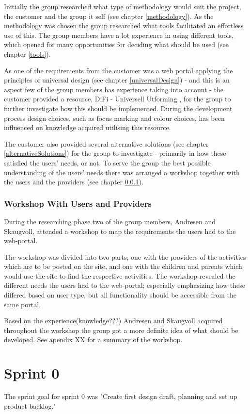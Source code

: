 Initially the group researched what type of methodology would suit the project, the customer and the group it self (see chapter \ref{methodology}). As the methodology was chosen the group researched what tools facilitated an effortless use of this. The group members have a lot experience in using different tools, which opened for many opportunities for deciding what should be used (see chapter \ref{tools}).

As one of the requirements from the customer was a web portal applying the principles of universal design (see chapter \ref{universalDesign}) - and this is an aspect few of the group members has experience taking into account - the customer provided a resource, DiFi - Universell Utforming \cite{Difi}, for the group to further investigate how this should be implemented. During the development process design choices, such as focus marking and colour choices, has been influenced on knowledge acquired utilising this resource. 

The customer also provided several alternative solutions (see chapter \ref{alternativeSolutions}) for the group to investigate - primarily in how these satisfied the users' needs, or not. To serve the group the best possible understanding of the users' needs there was arranged a workshop together with the users and the providers (see chapter \ref{workshop}). 


\subsubsection{Workshop With Users and Providers}
\label{workshop}
During the researching phase two of the group members, Andresen and Skaugvoll, attended a workshop to map the requirements the users had to the web-portal. 

The workshop was divided into two parts; one with the providers of the activities which are to be posted on the site, and one with the children and parents which would use the site to find the respective activities. The workshop revealed the different needs the users had to the web-portal; especially emphasizing how these differed based on user type, but all functionality should be accessible from the same portal. 

Based on the experience(knowledge???) Andresen and Skaugvoll acquired throughout the workshop the group got a more definite idea of what should be developed. See apendix XX for a summary of the workshop.


\section{Sprint 0}
\label{sprint0}
The sprint goal for sprint 0 was "Create first design draft, planning and set up product backlog." \\

